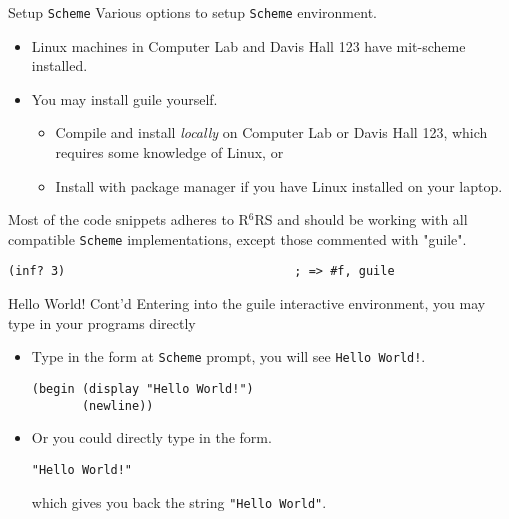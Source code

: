 \documentclass[presentation]{beamer}
\begin{document}
\begin{frame}[fragile,label={sec:orgheadline3}]{Setup \texttt{Scheme}}
 Various options to setup \texttt{Scheme} environment.

\begin{itemize}
\item Linux machines in Computer Lab and Davis Hall 123 have mit-scheme
installed.
\item You may install guile yourself.
\begin{itemize}
\item Compile and install \emph{locally} on Computer Lab or Davis Hall
123, which requires some knowledge of Linux, or
\item Install with package manager if you have Linux installed on
your laptop.
\end{itemize}
\end{itemize}


Most of the code snippets adheres to R\(^{\text{6}}\)RS and should be working
with all compatible \texttt{Scheme} implementations, except those
commented with "guile".

\begin{verbatim}
(inf? 3)                                ; => #f, guile
\end{verbatim}
\end{frame}

\begin{frame}[fragile,label={sec:orgheadline4}]{Hello World! Cont'd}
 Entering into the guile interactive environment, you may type in
your programs directly

\begin{itemize}
\item Type in the form at \texttt{Scheme} prompt, you will see \texttt{Hello World!}.

\begin{verbatim}
(begin (display "Hello World!")
       (newline))
\end{verbatim}

\item Or you could directly type in the form.

\begin{verbatim}
"Hello World!"
\end{verbatim}

which gives you back the string \texttt{​"Hello World"​}.
\end{itemize}
\end{frame}
\end{document}
